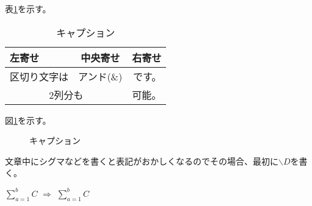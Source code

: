 \documentclass[11pt]{jsarticle} %
\newcommand{\D}{\displaystyle} %
\begin{document}
表\ref{table;tmp1}を示す。
\begin{table}[H]
	\caption{キャプション}
	\label{table;tmp1} %
	\begin{center}
		\begin{tabular}{lcr} %
			\hline
			左寄せ & 中央寄せ & 右寄せ\\
			\hline
			区切り文字は & アンド(\&) & です。\\
			\multicolumn{2}{c}{2列分も} & 可能。\\
			\hline
		\end{tabular}
	\end{center}
\end{table}

図\ref{figure;tmp2}を示す。
\begin{figure}[H]
	\begin{center} %
		\vspace{2cm} %
		\caption{キャプション}
    \label{figure;tmp2} %
  \end{center}
\end{figure}


\newpage %


文章中にシグマなどを書くと表記がおかしくなるのでその場合、最初に$\backslash D$を書く。


$\sum_{a=1}^b C$ $\Rightarrow$ $\D \sum_{a=1}^b C$
\end{document}
